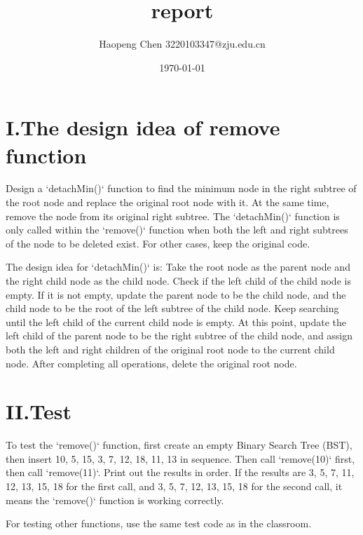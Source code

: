 \documentclass[a4paper]{article}
\begin{document}
\title{report}
\author{Haopeng Chen 3220103347@zju.edu.cn}
\date{\today}
\maketitle
\section*{I.The design idea of remove function}
Design a `detachMin()` function to find the minimum node in the right subtree of the root node and replace the original root node with it. At the same time, remove the node from its original right subtree. The `detachMin()` function is only called within the `remove()` function when both the left and right subtrees of the node to be deleted exist. For other cases, keep the original code.

The design idea for `detachMin()` is: Take the root node as the parent node and the right child node as the child node. Check if the left child of the child node is empty. If it is not empty, update the parent node to be the child node, and the child node to be the root of the left subtree of the child node. Keep searching until the left child of the current child node is empty. At this point, update the left child of the parent node to be the right subtree of the child node, and assign both the left and right children of the original root node to the current child node. After completing all operations, delete the original root node.

\section*{II.Test}
To test the `remove()` function, first create an empty Binary Search Tree (BST), then insert 10, 5, 15, 3, 7, 12, 18, 11, 13 in sequence. Then call `remove(10)` first, then call `remove(11)`. Print out the results in order. If the results are 3, 5, 7, 11, 12, 13, 15, 18 for the first call, and 3, 5, 7, 12, 13, 15, 18 for the second call, it means the `remove()` function is working correctly.

For testing other functions, use the same test code as in the classroom.
\end{document}
